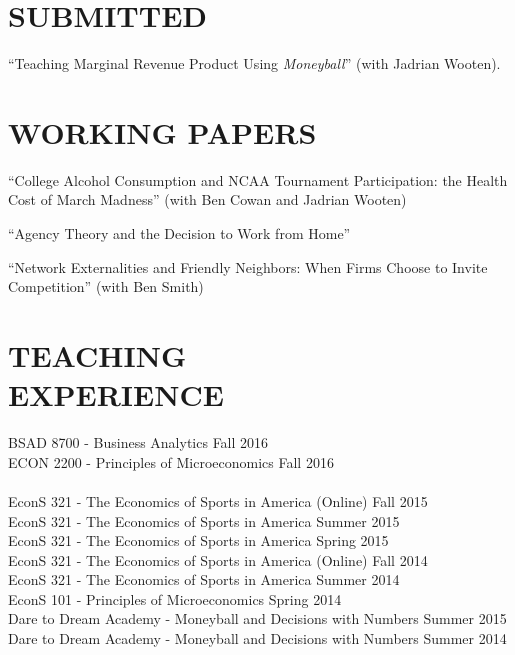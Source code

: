 \documentclass[margin]{res}  %
\begin{document}
\begin{resume}
\section{\textnormal{SUBMITTED}}
``Teaching Marginal Revenue Product Using \emph{Moneyball}'' (with Jadrian Wooten).


\section{\textnormal{WORKING PAPERS}}

``College Alcohol Consumption and NCAA Tournament Participation: the Health Cost of March Madness'' (with Ben Cowan and Jadrian Wooten)

``Agency Theory and the Decision to Work from Home''

``Network Externalities and Friendly Neighbors: When Firms Choose to Invite Competition'' (with Ben Smith)

\section{\textnormal{TEACHING \\EXPERIENCE}}

BSAD 8700 - Business Analytics \hfill Fall 2016\\
ECON 2200 - Principles of Microeconomics \hfill Fall 2016\\\\
EconS 321 - The Economics of Sports in America (Online) \hfill Fall 2015 \\
EconS 321 - The Economics of Sports in America \hfill Summer 2015 \\
EconS 321 - The Economics of Sports in America \hfill Spring 2015 \\
EconS 321 - The Economics of Sports in America (Online) \hfill Fall 2014 \\
EconS 321 - The Economics of Sports in America \hfill Summer 2014 \\[12pt]
EconS 101 - Principles of Microeconomics \hfill Spring 2014 \\[12pt]
Dare to Dream Academy - Moneyball and Decisions with Numbers \hfill Summer 2015 \\
Dare to Dream Academy - Moneyball and Decisions with Numbers \hfill Summer 2014 \\


\end{resume}
\end{document}
